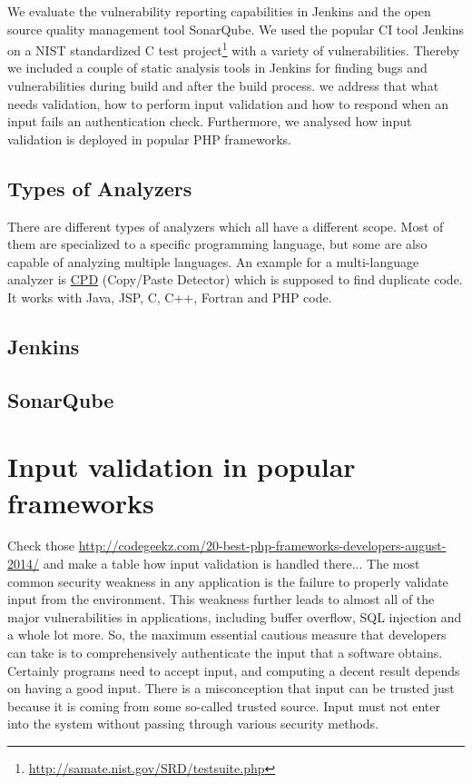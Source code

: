 \documentclass[conference]{IEEEtran}
\begin{document}
We evaluate the vulnerability reporting capabilities in Jenkins and the open source quality management tool SonarQube.
We used the popular CI tool Jenkins on a NIST standardized C test project\footnote{\url{http://samate.nist.gov/SRD/testsuite.php}} with a variety of vulnerabilities.
Thereby we included a couple of static analysis tools in Jenkins for finding bugs and vulnerabilities during build and after the build process.
we address that what needs validation, how to perform input validation and how to respond when an input fails an authentication check. Furthermore, we analysed how input validation is deployed in popular PHP frameworks.

\subsection{Types of Analyzers}
There are different types of analyzers which all have a different scope. Most of them are specialized to a specific programming language, but some are also capable of analyzing multiple languages. An example for a multi-language analyzer is \href{http://pmd.sourceforge.net/pmd-4.3.0/cpd.html}{CPD} (Copy/Paste Detector) which is supposed to find duplicate code. It works with Java, JSP, C, C++, Fortran and PHP code.

\subsection{Jenkins}

\subsection{SonarQube}

\section{Input validation in popular frameworks}
\label{sec:input_validation}
Check those \url{http://codegeekz.com/20-best-php-frameworks-developers-august-2014/} and make a table how input validation is handled there...
The most common security weakness in any application is the failure to properly validate input from the environment. This weakness further leads to almost all of the major vulnerabilities in applications, including buffer overflow, SQL injection and a whole lot more. So, the maximum essential cautious measure that developers can take is to comprehensively authenticate the input that a software obtains. Certainly programs need to accept input, and computing a decent result depends on having a good input. There is a misconception that input can be trusted just because it is coming from some so-called trusted source. Input must not enter into the system without passing through various security methods.
\end{document}
